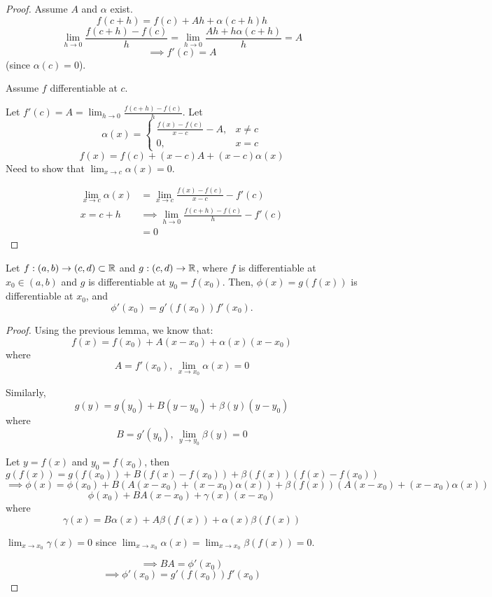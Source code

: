\documentclass[a4paper,10pt]{article}
\begin{document}
\begin{proof}
	Assume $A$ and $\alpha$ exist.
	\[ f(c+h) = f(c) + Ah + \alpha(c+h)h \]
	\[
		\lim_{h \to 0} \frac{f(c+h) - f(c)}{h}
		= \lim_{h \to 0} \frac{Ah + h\alpha(c+h)}{h} = A
	\]
	\[ \implies f'(c) = A\]
	(since $\alpha(c) = 0$).

	Assume $f$ differentiable at $c$.

	Let $f'(c) = A = \lim_{h \to 0}\frac{f(c+h) - f(c)}{h}$.
	Let
	\[
		\alpha(x) =
		\begin{cases}
			\frac{f(x) - f(c)}{x-c} - A, &x \neq c \\
			0, &x = c
		\end{cases}
	\]
	\[ f(x) = f(c) + (x-c)A + (x-c)\alpha(x) \]
	Need to show that $\lim_{x \to c} \alpha(x) = 0$.

	\begin{align*}
		\lim_{x \to c} \alpha(x) &= \lim_{x \to c}\frac{f(x)-f(c)}{x-c} - f'(c) \\
		x = c+h &\implies \lim_{h \to 0} \frac{f(c+h)-f(c)}{h} - f'(c) \\
			&= 0
	\end{align*}
\end{proof}

\begin{lemma}
	Let $f:(a,b) \to (c,d) \subset \mathbb{R}$ and $g:(c,d) \to \mathbb{R}$, where
	$f$ is differentiable at $x_0 \in (a,b)$ and $g$ is
	differentiable at $y_0 = f(x_0)$. Then, $\phi(x) = g(f(x))$ is
	differentiable at $x_0$, and
	\[ \phi'(x_0) = g'(f(x_0))f'(x_0). \]
\end{lemma}


\begin{proof}
	Using the previous lemma, we know that:
	\[ f(x) = f(x_0) + A(x-x_0) + \alpha(x)(x-x_0) \]
	where
	\[ A = f'(x_0), \, \lim_{x \to x_0} \alpha(x) = 0 \]

	Similarly,
	\[ g(y) = g(y_0) + B(y-y_0) + \beta(y)(y-y_0) \]
	where
	\[ B = g'(y_0), \, \lim_{y \to y_0} \beta(y) = 0 \]

	Let $y = f(x)$ and $y_0 = f(x_0)$, then
	\[ g(f(x)) = g(f(x_0)) + B(f(x)-f(x_0)) + \beta(f(x))(f(x) - f(x_0)) \]
	\[
		\implies \phi(x) = \phi(x_0) + B(A(x-x_0) + (x-x_0)\alpha(x))
		+ \beta(f(x))(A(x-x_0) + (x-x_0)\alpha(x))
	\]
	\[ \phi(x_0) + BA(x-x_0) + \gamma(x)(x-x_0) \]
	where
	\[ \gamma(x) = B\alpha(x) + A\beta(f(x)) + \alpha(x)\beta(f(x)) \]

	$\lim_{x \to x_0} \gamma(x) = 0$ since $\lim_{x \to x_0} \alpha(x) = \lim_{x \to x_0} \beta(f(x)) = 0$.

	\[ \implies BA = \phi'(x_0) \]
	\[ \implies \phi'(x_0) = g'(f(x_0))f'(x_0) \]
\end{proof}
\end{document}

